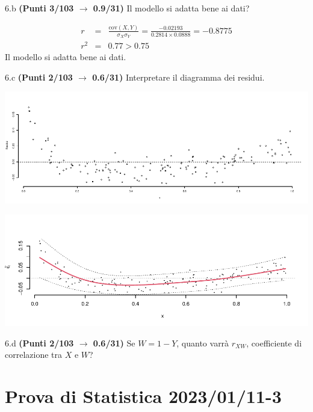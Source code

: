 \documentclass[
  11pt,
]{book}
\theoremstyle{mytheoremstyle}
\theoremstyle{mydefstyle}
\newenvironment{sol}
  {
  \begin{tcolorbox}[enhanced,breakable,arc=0.1mm,boxrule=1pt,colback=white,colframe=iblue,
  title=\bf \fontfamily{lmss}\selectfont \hspace{.5 cm} Soluzione,drop fuzzy shadow]

}{
\end{tcolorbox}
  }
\begin{document}
6.b \textbf{(Punti 3/103 \(\rightarrow\) 0.9/31)} Il modello si adatta bene ai dati?

\begin{sol}
\begin{eqnarray*}
r&=&\frac{\text{cov}(X,Y)}{\sigma_X\sigma_Y}=\frac{ -0.02193 }{ 0.2814 \times 0.0888 }= -0.8775 \\r^2&=& 0.77 > 0.75
\end{eqnarray*}
Il modello si adatta bene ai dati.

\end{sol}

6.c \textbf{(Punti 2/103 \(\rightarrow\) 0.6/31)} Interpretare il diagramma dei residui.

\begin{center}\includegraphics{Esami_passati_con_soluzioni_files/figure-latex/2023-122-1} \end{center}

\begin{sol}

\begin{center}\includegraphics{Esami_passati_con_soluzioni_files/figure-latex/2023-10,-1} \end{center}

\end{sol}

6.d \textbf{(Punti 2/103 \(\rightarrow\) 0.6/31)} Se \(W= 1 - Y\), quanto varrà \(r_{XW}\), coefficiente di correlazione tra \(X\) e \(W\)?

\section{Prova di Statistica 2023/01/11-3}\label{prova-di-statistica-20230111-3}
\end{document}
